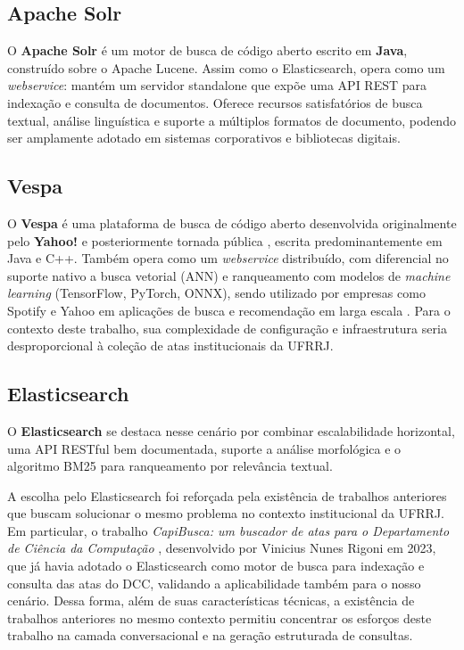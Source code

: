 \subsection{Apache Solr}

O \textbf{Apache Solr} \cite{solr-docs} é um motor de busca de código aberto escrito em \textbf{Java}, construído sobre o Apache Lucene. Assim como o Elasticsearch, opera como um \textit{webservice}: mantém um servidor standalone que expõe uma API REST para indexação e consulta de documentos. Oferece recursos satisfatórios de busca textual, análise linguística e suporte a múltiplos formatos de documento, podendo ser amplamente adotado em sistemas corporativos e bibliotecas digitais.

\subsection{Vespa}

O \textbf{Vespa} \cite{vespa-docs} é uma plataforma de busca de código aberto desenvolvida originalmente pelo \textbf{Yahoo!} e posteriormente tornada pública \cite{vespa-site}, escrita predominantemente em Java e C++. Também opera como um \textit{webservice} distribuído, com diferencial no suporte nativo a busca vetorial (ANN) e ranqueamento com modelos de \textit{machine learning} (TensorFlow, PyTorch, ONNX), sendo utilizado por empresas como Spotify e Yahoo em aplicações de busca e recomendação em larga escala \cite{vespa-site}. Para o contexto deste trabalho, sua complexidade de configuração e infraestrutura seria desproporcional à coleção de atas institucionais da UFRRJ.

\subsection{Elasticsearch}

O \textbf{Elasticsearch} \cite{IBMElasticsearch} se destaca nesse cenário por combinar escalabilidade horizontal, uma API RESTful bem documentada, suporte a análise morfológica e o algoritmo BM25 para ranqueamento por relevância textual.

A escolha pelo Elasticsearch foi reforçada pela existência de trabalhos anteriores que buscam solucionar o mesmo problema no contexto institucional da UFRRJ. Em particular, o trabalho \textit{CapiBusca: um buscador de atas para o Departamento de Ciência da Computação} \cite{rigoni2023capibusca}, desenvolvido por Vinicius Nunes Rigoni em 2023, que já havia adotado o Elasticsearch como motor de busca para indexação e consulta das atas do DCC, validando a aplicabilidade também para o nosso cenário. Dessa forma, além de suas características técnicas, a existência de trabalhos anteriores no mesmo contexto permitiu concentrar os esforços deste trabalho na camada conversacional e na geração estruturada de consultas.

